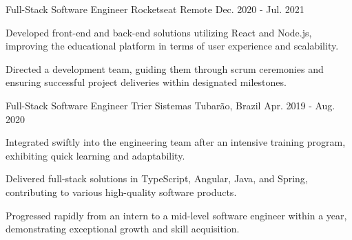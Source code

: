 \begin{cventries}
  \cventry
    {Full-Stack Software Engineer} %
    {Rocketseat} %
    {Remote} %
    {Dec. 2020 - Jul. 2021} %
    {
      \begin{cvitems} %
        \item {Developed front-end and back-end solutions utilizing React and Node.js, improving the educational platform in terms of user experience and scalability.}
        \item {Directed a development team, guiding them through scrum ceremonies and ensuring successful project deliveries within designated milestones.}
      \end{cvitems}
    }

\cventry
  {Full-Stack Software Engineer} %
  {Trier Sistemas} %
  {Tubarão, Brazil} %
  {Apr. 2019 - Aug. 2020} %
  {
    \begin{cvitems}
      \item {Integrated swiftly into the engineering team after an intensive training program, exhibiting quick learning and adaptability.}
      \item {Delivered full-stack solutions in TypeScript, Angular, Java, and Spring, contributing to various high-quality software products.}
      \item {Progressed rapidly from an intern to a mid-level software engineer within a year, demonstrating exceptional growth and skill acquisition.}
    \end{cvitems}
  }

\end{cventries}
